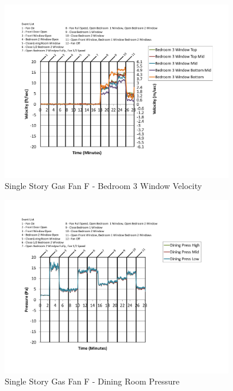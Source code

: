\documentclass{article}
\begin{document}
\begin{appendices}
	\begin{figure}[H]
		\centering
		\includegraphics[height=3.05in,trim=0.67in 1.1in 0.67in 0.8in,clip=true]{0_Images/Results_Charts/ColdFlow/Single_Story/Gas/F/Bedroom_3_Window_Velocity.pdf}
		\caption{Single Story Gas Fan F - Bedroom 3 Window Velocity}
	\end{figure}
 

	\begin{figure}[H]
		\centering
		\includegraphics[height=3.05in,trim=0.67in 1.1in 0.67in 0.8in,clip=true]{0_Images/Results_Charts/ColdFlow/Single_Story/Gas/F/Dining_Room_Pressure.pdf}
		\caption{Single Story Gas Fan F - Dining Room Pressure}
	\end{figure}
 
	\clearpage


\end{appendices}
\end{document}
